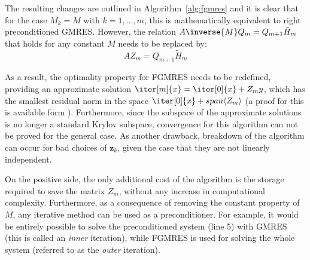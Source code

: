 \noindent The resulting changes are outlined in Algorithm~\hyperref[alg:fgmres]{\ref{alg:fgmres}} and it is clear that for the case $M_k=M$ with $k=1,\dots,m$, this is mathematically equivalent to right preconditioned GMRES. However, the relation $A\inverse{M}Q_m=Q_{m+1}\tilde{H}_m$ that holds for any constant $M$ needs to be replaced by:
\begin{equation}
    AZ_m=Q_{m+1}\tilde{H}_m
\end{equation}

\noindent As a result, the optimality property for FGMRES needs to be redefined, providing an approximate solution $\iter[m]{x}=\iter[0]{x}+Z_my$, which has the smallest residual norm in the space $\iter[0]{x}+span\langle Z_m\rangle$ (a proof for this is available form \cite{saad_iterative_2003}). Furthermore, since the subspace of the approximate solutions is no longer a standard Krylov subspace, convergence for this algorithm can not be proved for the general case. As another drawback, breakdown of the algorithm can occur for bad choices of $\bm{z}_k$, given the case that they are not linearly independent. 

On the positive side, the only additional cost of the algorithm is the storage required to save the matrix $Z_m$, without any increase in computational complexity. Furthermore, as a consequence of removing the constant property of $M$, any iterative method can be used as a preconditioner. For example, it would be entirely possible to solve the preconditioned system (line 5) with GMRES (this is called an \textit{inner} iteration), while FGMRES is used for solving the whole system (referred to as the \textit{outer} iteration).
